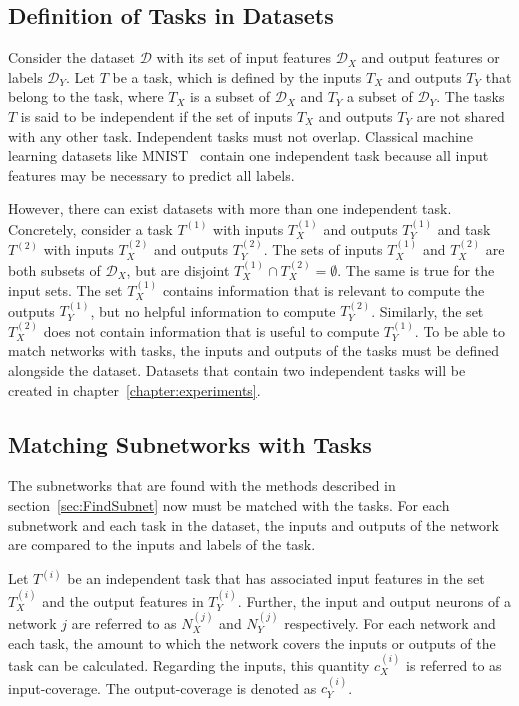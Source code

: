 \subsection{Definition of Tasks in Datasets}
Consider the dataset $\mathcal{D}$ with its set of input features $\mathcal{D}_X$ and output features or labels $\mathcal{D}_Y$.
Let $T$ be a task, which is defined by the inputs $T_X$ and outputs $T_Y$ that belong to the task, where $T_X$ is a subset of $\mathcal{D}_X$ and $T_Y$ a subset of $\mathcal{D}_Y$.
The tasks $T$ is said to be independent if the set of inputs $T_X$ and outputs $T_Y$ are not shared with any other task.
Independent tasks must not overlap.
Classical machine learning datasets like MNIST~\textcite{mnist} contain one independent task because all input features may be necessary to predict all labels.

However, there can exist datasets with more than one independent task.
Concretely, consider a task $T^{(1)}$ with inputs $T^{(1)}_X$ and outputs $T^{(1)}_Y$ and task $T^{(2)}$ with inputs $T^{(2)}_X$ and outputs $T^{(2)}_Y$.
The sets of inputs $T^{(1)}_X$ and $T^{(2)}_X$ are both subsets of $\mathcal{D}_X$, but are disjoint $T^{(1)}_X \cap T^{(2)}_X = \emptyset$.
The same is true for the input sets.
The set $T^{(1)}_X$ contains information that is relevant to compute the outputs $T^{(1)}_Y$, but no helpful information to compute $T^{(2)}_Y$.
Similarly, the set $T^{(2)}_X$ does not contain information that is useful to compute $T^{(1)}_Y$.
To be able to match networks with tasks, the inputs and outputs of the tasks must be defined alongside the dataset.
Datasets that contain two independent tasks will be created in chapter~\ref{chapter:experiments}.

\subsection{Matching Subnetworks with Tasks}
The subnetworks that are found with the methods described in section~\ref{sec:FindSubnet} now must be matched with the tasks.
For each subnetwork and each task in the dataset, the inputs and outputs of the network are compared to the inputs and labels of the task.

Let $T^{(i)}$ be an independent task that has associated input features in the set $T^{(i)}_X$ and the output features in $T^{(i)}_Y$.
Further, the input and output neurons of a network $j$ are referred to as $N^{(j)}_X$ and $N^{(j)}_Y$ respectively.
For each network and each task, the amount to which the network covers the inputs or outputs of the task can be calculated.
Regarding the inputs, this quantity $c^{(i)}_X$ is referred to as input-coverage. The output-coverage is denoted as $c^{(i)}_Y$.


